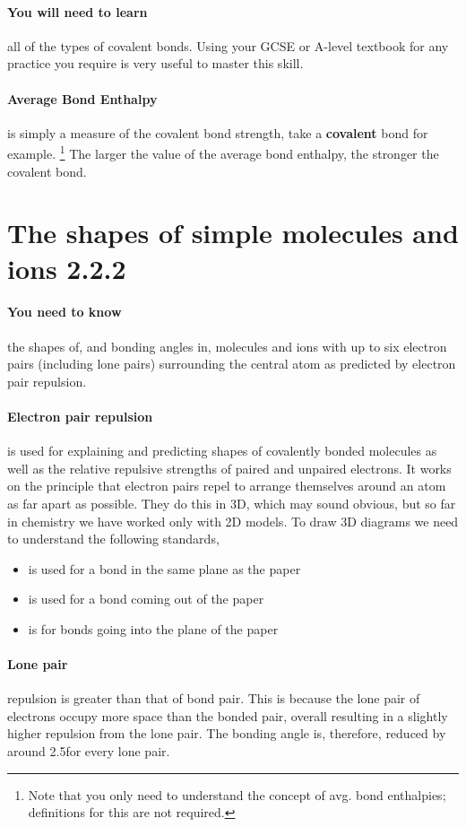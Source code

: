 \paragraph{You will need to learn}all of the types of covalent bonds. Using your GCSE or A-level textbook for any practice you require is very useful to master this skill.
	\paragraph{Average Bond Enthalpy} is simply a measure of the  covalent bond strength, take a  \textbf{covalent} bond for example. \footnote{Note that you only need to understand the concept of avg. bond enthalpies; definitions for this are not required.}
   The larger the value of the average bond enthalpy, the stronger the covalent bond.
    \section{The shapes of simple molecules and ions 2.2.2}
	
	\paragraph{You need to know} the shapes of, and bonding angles in, molecules and ions with up to six electron pairs (including lone pairs) surrounding the central atom as predicted by electron pair repulsion.
	
	\paragraph{Electron pair repulsion} is used for explaining and predicting shapes of covalently bonded molecules as well as the relative repulsive strengths of paired and unpaired electrons.
	It works on the principle that electron pairs repel to arrange themselves around an atom as far apart as possible.
	They do this in 3D, which may sound obvious, but so far in chemistry we have worked only with 2D models.
	To draw 3D diagrams we need to understand the following standards,
	\begin{itemize}
		\item {} is used for a bond in the same plane as the paper
		\item {} is used for a bond coming out of the paper
		\item {} is for bonds going into the plane of the paper
	\end{itemize}
    \paragraph{Lone pair} repulsion is greater than that of bond pair.
	This is because the lone pair of electrons occupy more space than the bonded pair, overall resulting in a slightly higher repulsion from the lone pair.
	The bonding angle is, therefore, reduced by around 2.5\degree for every lone pair.
	

